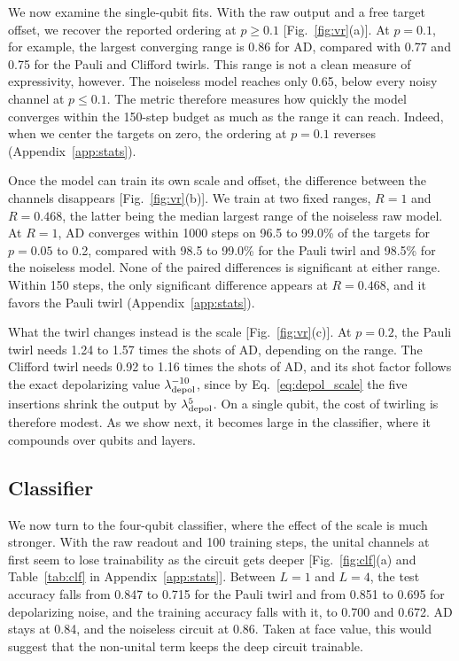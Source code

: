 \documentclass[
 aps,pra,
 twocolumn,
 superscriptaddress,
 longbibliography,
 nofootinbib
]{revtex4-2}
\begin{document}
We now examine the single-qubit fits. With
the raw output and a free target offset, we recover the reported ordering at
$p\ge0.1$ [Fig.~\ref{fig:vr}(a)]. At $p=0.1$, for example, the largest
converging range is 0.86 for AD, compared with 0.77 and 0.75 for the Pauli and
Clifford twirls. This range is not a clean measure of expressivity,
however. The noiseless model reaches only 0.65, below every noisy channel at
$p\le0.1$. The metric therefore measures how quickly the model converges within
the 150-step budget as much as the range it can reach. Indeed, when we center
the targets on zero, the ordering at $p=0.1$ reverses (Appendix~\ref{app:stats}).

Once the model can train its own scale and offset, the difference between the
channels disappears [Fig.~\ref{fig:vr}(b)]. We train at two fixed ranges, $R=1$
and $R=0.468$, the latter being the median largest range of the noiseless raw
model. At $R=1$, AD converges within 1000 steps on 96.5 to 99.0\% of the
targets for $p=0.05$ to 0.2, compared with 98.5 to 99.0\% for the Pauli twirl
and 98.5\% for the noiseless model. None of the paired differences is
significant at either range. Within 150 steps, the only significant difference
appears at $R=0.468$, and it favors the Pauli twirl (Appendix~\ref{app:stats}).

What the twirl changes instead is the scale [Fig.~\ref{fig:vr}(c)]. At $p=0.2$,
the Pauli twirl needs 1.24 to 1.57 times the shots of AD, depending on the
range. The Clifford twirl needs 0.92 to 1.16 times the shots of AD, and its
shot factor follows the exact depolarizing value $\lambda_{\rm depol}^{-10}$,
since by Eq.~\eqref{eq:depol_scale} the five insertions shrink the output by
$\lambda_{\rm depol}^5$. On a single qubit, the cost of twirling is therefore
modest. As we show next, it becomes large in the classifier, where it compounds
over qubits and layers.

\subsection{Classifier}
\label{sec:clf}

We now turn to the four-qubit classifier, where the effect of the scale is much
stronger. With the raw readout and 100 training steps, the unital channels at
first seem to lose trainability as the circuit gets deeper
[Fig.~\ref{fig:clf}(a) and Table~\ref{tab:clf} in Appendix~\ref{app:stats}]. Between $L=1$ and $L=4$, the test
accuracy falls from 0.847 to 0.715 for the Pauli twirl and from 0.851 to 0.695
for depolarizing noise, and the training accuracy falls with it, to 0.700 and
0.672. AD stays at 0.84, and the noiseless circuit at 0.86. Taken at face
value, this would suggest that the non-unital term keeps the deep circuit
trainable.
\end{document}
